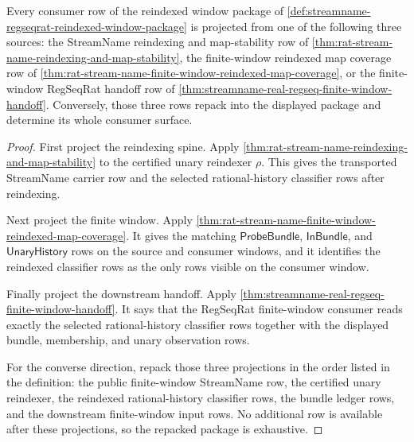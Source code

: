 \begin{theorem}
\label{thm:streamname-regseqrat-reindexed-window-exhaustion}
Every consumer row of the reindexed window package of
\autoref{def:streamname-regseqrat-reindexed-window-package} is projected from
one of the following three sources: the StreamName reindexing and map-stability
row of \autoref{thm:rat-stream-name-reindexing-and-map-stability}, the
finite-window reindexed map coverage row of
\autoref{thm:rat-stream-name-finite-window-reindexed-map-coverage}, or the
finite-window RegSeqRat handoff row of
\autoref{thm:streamname-real-regseq-finite-window-handoff}. Conversely, those
three rows repack into the displayed package and determine its whole consumer
surface.
\end{theorem}
\begin{proof}
First project the reindexing spine. Apply
\autoref{thm:rat-stream-name-reindexing-and-map-stability} to the certified
unary reindexer $\rho$. This gives the transported StreamName carrier row and
the selected rational-history classifier rows after reindexing.

Next project the finite window. Apply
\autoref{thm:rat-stream-name-finite-window-reindexed-map-coverage}. It gives
the matching $\mathsf{ProbeBundle}$, $\mathsf{InBundle}$, and
$\mathsf{UnaryHistory}$ rows on the source and consumer windows, and it
identifies the reindexed classifier rows as the only rows visible on the
consumer window.

Finally project the downstream handoff. Apply
\autoref{thm:streamname-real-regseq-finite-window-handoff}. It says that the
RegSeqRat finite-window consumer reads exactly the selected rational-history
classifier rows together with the displayed bundle, membership, and unary
observation rows.

For the converse direction, repack those three projections in the order listed
in the definition: the public finite-window StreamName row, the certified
unary reindexer, the reindexed rational-history classifier rows, the bundle
ledger rows, and the downstream finite-window input rows. No additional row is
available after these projections, so the repacked package is exhaustive.
\end{proof}

